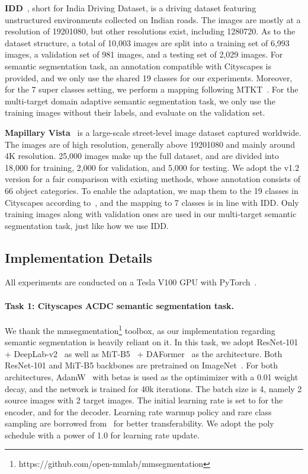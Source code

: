 \documentclass[letterpaper]{article} \usepackage{aaai23}  \usepackage{times}  \usepackage{helvet}  \usepackage{courier}  \usepackage[hyphens]{url}  \usepackage{graphicx} \urlstyle{rm} \def\UrlFont{\rm}  \usepackage{natbib}  \usepackage{caption} \frenchspacing  \setlength{\pdfpagewidth}{8.5in}  \setlength{\pdfpageheight}{11in}  \usepackage{algorithm}
\begin{document}
\noindent\textbf{IDD}~\cite{varma2019idd}, short for India Driving Dataset, is a driving dataset featuring unstructured environments collected on Indian roads. The images are mostly at a resolution of 19201080, but other resolutions exist, including 1280720. As to the dataset structure, a total of 10,003 images are split into a training set of 6,993 images, a validation set of 981 images, and a testing set of 2,029 images. For semantic segmentation task, an annotation compatible with Cityscapes is provided, and we only use the shared 19 classes for our experiments. Moreover, for the 7 super classes setting, we perform a mapping following MTKT~\cite{saporta2021multi}. For the multi-target domain adaptive semantic segmentation task, we only use the training images without their labels, and evaluate on the validation set. 

\noindent\textbf{Mapillary Vista}~\cite{neuhold2017mapillary} is a large-scale street-level image dataset captured worldwide. The images are of high resolution, generally above 19201080 and mainly around 4K resolution. 25,000 images make up the full dataset, and are divided into 18,000 for training, 2,000 for validation, and 5,000 for testing. We adopt the v1.2 version for a fair comparison with existing methods, whose annotation consists of 66 object categories. To enable the adaptation, we map them to the 19 classes in Cityscapes according to~\cite{he2020segmentations}, and the mapping to 7 classes is in line with IDD. Only training images along with validation ones are used in our multi-target semantic segmentation task, just like how we use IDD.


\subsection{Implementation Details}
\label{sec:implementation}
All experiments are conducted on a Tesla V100 GPU with PyTorch~\cite{paszke2019pytorch}.


\paragraph{Task 1: Cityscapes  ACDC semantic segmentation task.}
We thank the mmsegmentation\footnote{https://github.com/open-mmlab/mmsegmentation} toolbox, as our implementation regarding semantic segmentation is heavily reliant on it.
In this task, we adopt ResNet-101~\cite{he2016deep} + DeepLab-v2~\cite{chen2017deeplab} as well as MiT-B5~\cite{xie2021segformer} + DAFormer~\cite{lukas2021daformer} as the architecture. Both ResNet-101 and MiT-B5 backbones are pretrained on ImageNet~\cite{deng2009imagenet}. For both architectures, AdamW~\cite{loshchilov2017decoupled} with betas  is used as the optimimizer with a 0.01 weight decay, and the network is trained for 40k iterations. The batch size is 4, namely 2 source images with 2 target images. The initial learning rate is set to  for the encoder, and  for the decoder. Learning rate warmup policy and rare class sampling are borrowed from~\cite{lukas2021daformer} for better transferability. We adopt the poly schedule with a power of 1.0 for learning rate update.
\end{document}

